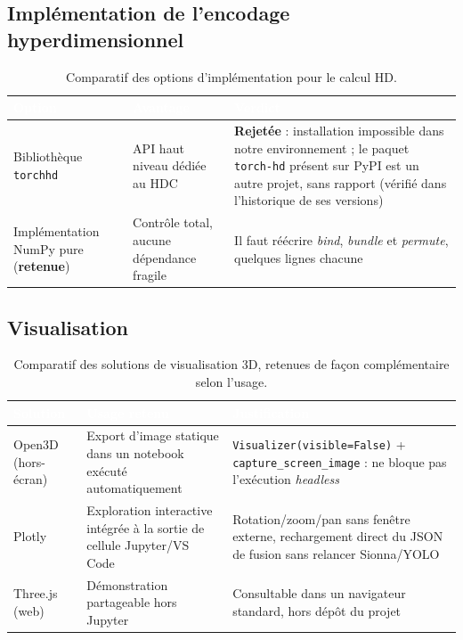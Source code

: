 \documentclass[12pt,a4paper,titlepage]{article}
\newcommand{\hd}[1]{\textcolor{white}{\textbf{#1}}}
\newcommand{\choix}{\rowcolor{tabchoice}}
\begin{document}
\subsection{Implémentation de l'encodage hyperdimensionnel}

\begin{table}[H]
    \centering
    \caption{Comparatif des options d'implémentation pour le calcul HD.}
    \begin{tabularx}{\textwidth}{F{3.4cm}LL}
        \toprule
        \hd{Option} & \hd{Avantage} & \hd{Verdict} \\
        \midrule
        Bibliothèque \texttt{torchhd} & API haut niveau dédiée au HDC & \textbf{Rejetée} : installation impossible dans notre environnement ; le paquet \texttt{torch-hd} présent sur PyPI est un autre projet, sans rapport (vérifié dans l'historique de ses versions) \\
        \choix Implémentation NumPy pure (\textbf{retenue}) & Contrôle total, aucune dépendance fragile & Il faut réécrire \textit{bind}, \textit{bundle} et \textit{permute}, quelques lignes chacune \\
        \bottomrule
    \end{tabularx}
\end{table}

\subsection{Visualisation}

\begin{table}[H]
    \centering
    \caption{Comparatif des solutions de visualisation 3D, retenues de façon complémentaire selon l'usage.}
    \begin{tabularx}{\textwidth}{F{3cm}LL}
        \toprule
        \hd{Solution} & \hd{Usage retenu} & \hd{Justification} \\
        \midrule
        Open3D~\cite{open3d} (hors-écran) & Export d'image statique dans un notebook exécuté automatiquement & \texttt{Visualizer(visible=False)} + \texttt{capture\_screen\_image} : ne bloque pas l'exécution \textit{headless} \\
        Plotly & Exploration interactive intégrée à la sortie de cellule Jupyter/VS Code & Rotation/zoom/pan sans fenêtre externe, rechargement direct du JSON de fusion sans relancer Sionna/YOLO \\
        Three.js (web) & Démonstration partageable hors Jupyter & Consultable dans un navigateur standard, hors dépôt du projet \\
        \bottomrule
    \end{tabularx}
\end{table}
\end{document}
